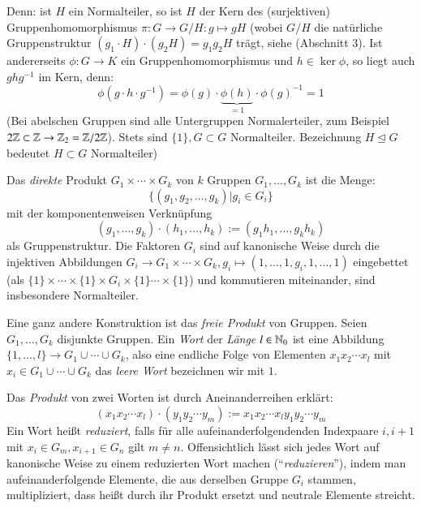 \documentclass[a4paper,10pt]{scrartcl}
\begin{document}
Denn: ist $H$ ein Normalteiler, so ist $H$ der Kern des (surjektiven) Gruppenhomomorphismus $\pi: G \to G/H: g\mapsto gH$ (wobei $G/H$ die natürliche Gruppenstruktur $(g_1\cdot H)\cdot (g_2 H)=g_1 g_2 H$ trägt, siehe (Abschnitt 3). Ist andererseits $\phi:G\to K$ ein Gruppenhomomorphismus und $h\in \ker \phi$, so liegt auch $ghg^{-1}$ im Kern, denn:
\[
 \phi(g\cdot h \cdot g^{-1})= \phi(g)\cdot\underbrace{\phi(h)}_{=1} \cdot \phi(g)^{-1}=1
\]
(Bei abelschen Gruppen sind alle Untergruppen Normalerteiler, zum Beispiel $2\mathbb{Z} \subset \mathbb{Z} \to \mathbb{Z}_2=\mathbb{Z}/2\mathbb{Z}$).
Stets sind $\{1\}, G\subset G$ Normalteiler. Bezeichnung  $H\trianglelefteq G$ bedeutet $H\subset G$ Normalteiler)

Das \emph{direkte} Produkt $G_1\times \dotsb \times G_k$ von $k$ Gruppen $G_1, \dotsc, G_k$ ist die Menge:
\[
 \{(g_1, g_2,\dotsc,g_k)|g_i \in G_i\}
\]
mit der komponentenweisen Verknüpfung
\[
 (g_1,\dotsc,g_k)\cdot (h_1,\dotsc, h_k):=(g_1h_1,\dotsc, g_kh_k)
\]
als Gruppenstruktur. Die Faktoren $G_i$ sind auf kanonische Weise durch die injektiven Abbildungen $G_i\to G_1\times \dotsb \times G_k, g_i \mapsto (1,\dotsc, 1, g_i, 1,\dotsc, 1)$ eingebettet (als $\{1\}\times \dotsb \times\{1\} \times G_i \times\{1\} \dotsb \times \{1\}$) und kommutieren miteinander, sind insbesondere Normalteiler.

 Eine ganz andere Konstruktion ist das \emph{freie Produkt} von Gruppen. Seien $G_1,\dotsc, G_k$ disjunkte Gruppen. Ein \emph{Wort} der \emph{Länge} $l\in \mathbb{N}_0$ ist eine Abbildung $\{1,\dotsc, l\} \to G_1\cup \dotsb \cup G_k$, also eine endliche Folge von Elementen $x_1x_2 \dotsb x_l$ mit $x_i\in G_1\cup \dotsb \cup G_k$ das \emph{leere Wort} bezeichnen wir mit $1$.

Das \emph{Produkt} von zwei Worten ist durch Aneinanderreihen erklärt:
\[
 (x_1x_2\dotsb x_l)\cdot (y_1y_2 \dotsb y_m):=x_1x_2 \dotsb x_ly_1y_2 \dotsb y_m
\]
Ein Wort heißt \emph{reduziert}, falls für alle aufeinanderfolgendenden Indexpaare $i, i+1$ mit $x_i\in G_m, x_{i+1}\in G_n$ gilt $m\neq n$. Offensichtlich lässt sich jedes Wort auf kanonische Weise zu einem reduzierten Wort machen ("`\emph{reduzieren}"'), indem man aufeinanderfolgende Elemente, die aus derselben Gruppe $G_i$ stammen, multipliziert, dass heißt durch ihr Produkt ersetzt und neutrale Elemente streicht. 
\end{document}
